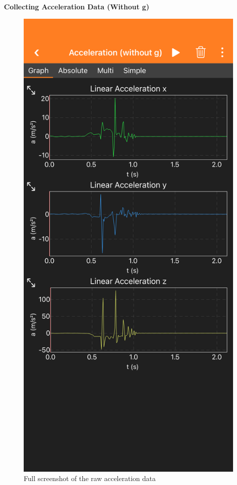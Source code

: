 \documentclass[idxtotoc,hyperref,openany]{labbook} %
\begin{document}
\newpage
{}
\textbf{Collecting Acceleration Data (Without g)}
\begin{figure}[H] %
\begin{center}
\includegraphics[width=.55\linewidth]{images/Lab.02/PhoneDropFull1.PNG}
\end{center}
\caption{Full screenshot of the raw acceleration data}
\label{fig:Lab02-PhoneDropFull1}
\end{figure}
\end{document}
